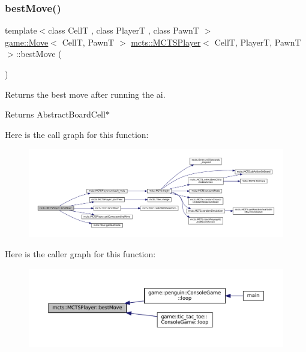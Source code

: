 \subsubsection{\texorpdfstring{best\+Move()}{bestMove()}}
{\footnotesize\ttfamily template$<$class CellT , class PlayerT , class PawnT $>$ \\
\hyperlink{structgame_1_1_move}{game\+::\+Move}$<$ CellT, PawnT $>$ \hyperlink{classmcts_1_1_m_c_t_s_player}{mcts\+::\+M\+C\+T\+S\+Player}$<$ CellT, PlayerT, PawnT $>$\+::best\+Move (\begin{DoxyParamCaption}{ }\end{DoxyParamCaption})}



Returns the best move after running the ai. 

\begin{DoxyReturn}{Returns}
Abstract\+Board\+Cell$\ast$ 
\end{DoxyReturn}
Here is the call graph for this function\+:
\nopagebreak
\begin{figure}[H]
\begin{center}
\leavevmode
\includegraphics[width=350pt]{classmcts_1_1_m_c_t_s_player_a48340fed9c5730f0d64ca177682f575e_cgraph}
\end{center}
\end{figure}
Here is the caller graph for this function\+:
\nopagebreak
\begin{figure}[H]
\begin{center}
\leavevmode
\includegraphics[width=350pt]{classmcts_1_1_m_c_t_s_player_a48340fed9c5730f0d64ca177682f575e_icgraph}
\end{center}
\end{figure}
\mbox{\label{classmcts_1_1_m_c_t_s_player_aa68be6bbbbd01044d42b9c2d0149b366}} 

